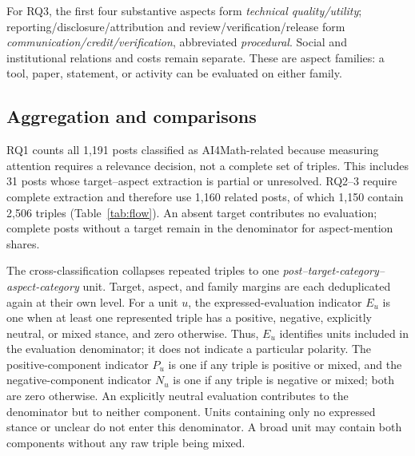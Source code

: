\documentclass[sigconf,balance=false]{acmart}
\begin{document}
For RQ3, the first four substantive aspects form \emph{technical quality/utility}; reporting/disclosure/attribution and review/verification/release form \emph{communication/credit/verification}, abbreviated \emph{procedural}. Social and institutional relations and costs remain separate. These are aspect families: a tool, paper, statement, or activity can be evaluated on either family.

\subsection{Aggregation and comparisons}\label{sec:aggregation}
RQ1 counts all 1,191 posts classified as AI4Math-related because measuring attention requires a relevance decision, not a complete set of triples. This includes 31 posts whose target--aspect extraction is partial or unresolved. RQ2--3 require complete extraction and therefore use 1,160 related posts, of which 1,150 contain 2,506 triples (Table~\ref{tab:flow}). An absent target contributes no evaluation; complete posts without a target remain in the denominator for aspect-mention shares.

The cross-classification collapses repeated triples to one \emph{post--target-category--aspect-category} unit. Target, aspect, and family margins are each deduplicated again at their own level. For a unit $u$, the expressed-evaluation indicator $E_u$ is one when at least one represented triple has a positive, negative, explicitly neutral, or mixed stance, and zero otherwise. Thus, $E_u$ identifies units included in the evaluation denominator; it does not indicate a particular polarity. The positive-component indicator $P_u$ is one if any triple is positive or mixed, and the negative-component indicator $N_u$ is one if any triple is negative or mixed; both are zero otherwise. An explicitly neutral evaluation contributes to the denominator but to neither component. Units containing only no expressed stance or unclear do not enter this denominator. A broad unit may contain both components without any raw triple being mixed.
\end{document}
